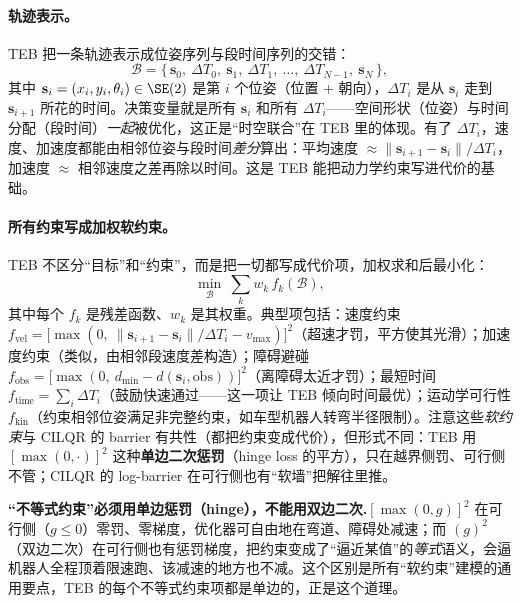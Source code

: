 \paragraph{轨迹表示。}
TEB 把一条轨迹表示成位姿序列与段时间序列的交错：
\begin{equation}
  \mathcal B=\{\,\mathbf s_0,\ \Delta T_0,\ \mathbf s_1,\ \Delta T_1,\ \dots,\ \Delta T_{N-1},\ \mathbf s_N\,\},
  \label{eq:st-teb-traj}
\end{equation}
其中 $\mathbf s_i=(x_i,y_i,\theta_i)\in\SE(2)$ 是第 $i$ 个位姿（位置 + 朝向），$\Delta T_i$ 是从 $\mathbf s_i$ 走到 $\mathbf s_{i+1}$ 所花的时间。决策变量就是所有 $\mathbf s_i$ 和所有 $\Delta T_i$——空间形状（位姿）与时间分配（段时间）\emph{一起}被优化，这正是“时空联合”在 TEB 里的体现。有了 $\Delta T_i$，速度、加速度都能由相邻位姿与段时间\emph{差分}算出：平均速度 $\approx\|\mathbf s_{i+1}-\mathbf s_i\|/\Delta T_i$，加速度 $\approx$ 相邻速度之差再除以时间。这是 TEB 能把动力学约束写进代价的基础。

\paragraph{所有约束写成加权软约束。}
TEB 不区分“目标”和“约束”，而是把一切都写成代价项，加权求和后最小化：
\begin{equation}
  \min_{\mathcal B}\ \sum_k w_k\, f_k(\mathcal B),
  \label{eq:st-teb-cost}
\end{equation}
其中每个 $f_k$ 是残差函数、$w_k$ 是其权重。典型项包括\cite{rosmann2017teb}：速度约束 $f_{\text{vel}}=\big[\max(0,\ \|\mathbf s_{i+1}-\mathbf s_i\|/\Delta T_i-v_{\max})\big]^2$（超速才罚，平方使其光滑）；加速度约束（类似，由相邻段速度差构造）；障碍避碰 $f_{\text{obs}}=\big[\max(0,\ d_{\min}-d(\mathbf s_i,\text{obs}))\big]^2$（离障碍太近才罚）；最短时间 $f_{\text{time}}=\sum_i\Delta T_i$（鼓励快速通过——这一项让 TEB 倾向时间最优）；运动学可行性 $f_{\text{kin}}$（约束相邻位姿满足非完整约束，如车型机器人转弯半径限制）。注意这些\emph{软约束}与 CILQR 的 barrier 有共性（都把约束变成代价），但形式不同：TEB 用 $[\max(0,\cdot)]^2$ 这种\textbf{单边二次惩罚}（hinge loss 的平方），只在越界侧罚、可行侧不管；CILQR 的 log-barrier 在可行侧也有“软墙”把解往里推。

\begin{insight}
\textbf{“不等式约束”必须用单边惩罚（hinge），不能用双边二次.}\;$[\max(0,g)]^2$ 在可行侧（$g\le 0$）零罚、零梯度，优化器可自由地在弯道、障碍处减速；而 $(g)^2$（双边二次）在可行侧也有惩罚梯度，把约束变成了“逼近某值”的\emph{等式}语义，会逼机器人全程顶着限速跑、该减速的地方也不减。这个区别是所有“软约束”建模的通用要点，TEB 的每个不等式约束项都是单边的，正是这个道理。
\end{insight}


